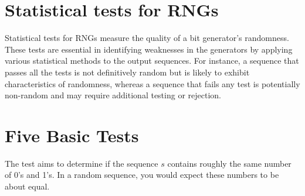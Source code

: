 \documentclass[12pt,openany]{book}
\theoremstyle{definition}
\begin{document}
\section{Statistical tests for RNGs}
Statistical tests for RNGs measure the quality of a bit generator's randomness. These tests are essential in identifying weaknesses in the generators by applying various statistical methods to the output sequences. For instance, a sequence that passes all the tests is not definitively random but is likely to exhibit characteristics of randomness, whereas a sequence that fails any test is potentially non-random and may require additional testing or rejection.

\newpage
\section{Five Basic Tests}
The test aims to determine if the sequence 
$s$ contains roughly the same number of 0's and 1's. In a random sequence, you would expect these numbers to be about equal.
\end{document}
